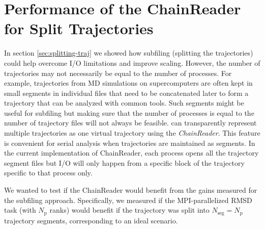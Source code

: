 
\section{Performance of the ChainReader for Split Trajectories}
\label{sec:chainreader}

In section \ref{sec:splitting-traj} we showed how subfiling (splitting the trajectories) could help overcome I/O limitations and improve scaling. 
However, the number of trajectories may not necessarily be equal to the number of processes.
For example, trajectories from MD simulations on supercomputers are often kept in small segments in individual files that need to be concatenated later to form a trajectory that can be analyzed with common tools.
Such segments might be useful for subfiling but making sure that the number of processes is equal to the number of trajectory files will not always be feasible. 
 can transparently represent multiple trajectories as one virtual trajectory using the \emph{ChainReader}.
This feature is convenient for serial analysis when trajectories are maintained as segments.
In the current implementation of ChainReader, each process opens all the trajectory segment files but I/O will only happen from a specific block of the trajectory specific to that process only.

We wanted to test if the ChainReader would benefit from the gains measured for the subfiling approach.
Specifically, we measured if the MPI-parallelized RMSD task (with $N_{\text{p}}$ ranks) would benefit if the trajectory was split into $N_{\text{seg}} = N_{\text{p}}$ trajectory segments, corresponding to an ideal scenario.
 
